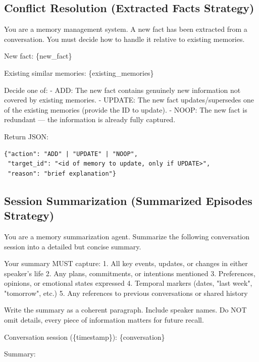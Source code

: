 \documentclass{article} %
\begin{document}
\vspace{0.3cm}

\subsection{Conflict Resolution (Extracted Facts Strategy)}

\begin{tcolorbox}[
  colback=gray!5!white,
  colframe=gray!75!black,
  title=Conflict Resolution Prompt,
  breakable
]
\small\ttfamily\raggedright
You are a memory management system. A new fact has been extracted from a conversation. You must decide how to handle it relative to existing memories.

New fact: \{new\_fact\}

Existing similar memories:
\{existing\_memories\}

Decide one of:
- ADD: The new fact contains genuinely new information not covered by existing memories.
- UPDATE: The new fact updates/supersedes one of the existing memories (provide the ID to update).
- NOOP: The new fact is redundant --- the information is already fully captured.

Return JSON:
\begin{lstlisting}[style=promptcode]
{"action": "ADD" | "UPDATE" | "NOOP",
 "target_id": "<id of memory to update, only if UPDATE>",
 "reason": "brief explanation"}
\end{lstlisting}
\end{tcolorbox}

\vspace{0.3cm}

\subsection{Session Summarization (Summarized Episodes Strategy)}

\begin{tcolorbox}[
  colback=gray!5!white,
  colframe=gray!75!black,
  title=Summarization Prompt,
  breakable
]
\small\ttfamily\raggedright
You are a memory summarization agent. Summarize the following conversation session into a detailed but concise summary.

Your summary MUST capture:
1. All key events, updates, or changes in either speaker's life
2. Any plans, commitments, or intentions mentioned
3. Preferences, opinions, or emotional states expressed
4. Temporal markers (dates, "last week", "tomorrow", etc.)
5. Any references to previous conversations or shared history

Write the summary as a coherent paragraph. Include speaker names. Do NOT omit details, every piece of information matters for future recall.

Conversation session (\{timestamp\}):
\{conversation\}

Summary:
\end{tcolorbox}
\end{document}
